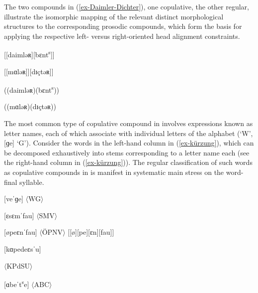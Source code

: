 \documentclass[output=paper
 ,nobabel
 ,draftmode
 ,colorlinks, citecolor=brown
]{langscibook}
\begin{document}
\zl

\largerpage
\enlargethispage{3pt}
\noindent
The two compounds in (\ref{ex-Daimler-Dichter}), one copulative, the other regular, illustrate the isomorphic mapping of the relevant distinct morphological structures to the corresponding prosodic compounds, which form the basis for applying the respective left- versus right-oriented head alignment constraints.


\eal\label{ex-Daimler-Dichter}
\ex {}[[daimləʀ]\textbf{}[bɛnt\textsuperscript{s}]\textbf{}]\textbf{}

\ex {}[[mɑləʀ]]\textbf{}[dɪçtəʀ]\textbf{}]\textbf{}
\z

\ex\label{ex-Daimler-Benz-P} 
\ea ((daimləʀ)(bɛnt\textsuperscript{s}))

\ex ((mɑləʀ)(dɪçtəʀ))
\z
\z


\noindent
The most common type of copulative compound in  involves expressions known as letter names, each of which associate with individual letters of the alphabet (\eg [ve] `W', [ɡe] `G'). Consider the words in the left-hand column in (\ref{ex-kürzung}), which can be decomposed exhaustively into stems corresponding to a letter name each (see the right-hand column in (\ref{ex-kürzung})). The regular classification of such words as copulative compounds in  is manifest in systematic main stress on the word-final syllable. 


\settowidth{}
\eal\label{ex-kürzung}
\ex\label{ex-wg}
{}[veˈɡe] $\langle$WG$\rangle$ 

\ex {}[ɛsɛmˈfau] $\langle$SMV$\rangle$ 

\ex {}[øpeɛnˈfau] $\langle$ÖPNV$\rangle$ [[ø][pe][ɛn][fau]]

\ex\label{ex-kpdsu}
{}[kɑpedeɛsˈu]

$\langle$KPdSU$\rangle$

\ex\label{ex-abc}
{}[ɑbeˈt\textsuperscript{s}e] $\langle$ABC$\rangle$ 
\zl
\end{document}
